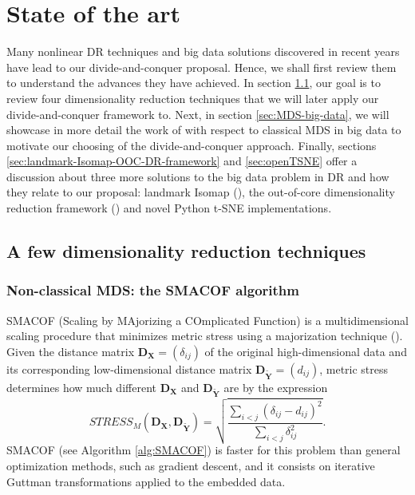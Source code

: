 \section{State of the art}

Many nonlinear DR techniques and big data solutions discovered in recent years have lead to our divide-and-conquer proposal. Hence, we shall first review them to understand the advances they have achieved. In section \ref{sec:DR-techniques}, our goal is to review four dimensionality reduction techniques that we will later apply our divide-and-conquer framework to. Next, in section \ref{sec:MDS-big-data}, we will showcase in more detail the work of \citet{Delicado2024} with respect to classical MDS in big data to motivate our choosing of the divide-and-conquer approach. Finally, sections \ref{sec:landmark-Isomap-OOC-DR-framework} and \ref{sec:openTSNE} offer a discussion about three more solutions to the big data problem in DR and how they relate to our proposal: landmark Isomap (\cite{Silva2002}), the out-of-core dimensionality reduction framework (\cite{Reichmann2024}) and novel Python t-SNE implementations.

\subsection{A few dimensionality reduction techniques}
\label{sec:DR-techniques}

\subsubsection{Non-classical MDS: the SMACOF algorithm}

SMACOF (Scaling by MAjorizing a COmplicated Function) is a multidimensional scaling procedure that minimizes metric stress using a majorization technique (\cite{Kruskal1964a,Kruskal1964b}). Given the distance matrix $\mathbf{D}_{\mathbf{X}} = (\delta_{ij})$ of the original high-dimensional data and its corresponding low-dimensional distance matrix $\mathbf{D}_{\mathbf{\tilde{Y}}} = (d_{ij})$, metric stress determines how much different $\mathbf{D}_{\mathbf{X}}$ and $\mathbf{D}_{\mathbf{\tilde{Y}}}$ are by the expression
$$
STRESS_M(\mathbf{D}_{\mathbf{X}}, \mathbf{D}_{\mathbf{\tilde{Y}}}) = \sqrt{\frac{\sum_{i<j}\left(\delta_{i j}-d_{i j}\right)^2}{\sum_{i<j} \delta_{i j}^2}}.
$$
SMACOF (see Algorithm \ref{alg:SMACOF}) is faster for this problem than general optimization methods, such as gradient descent, and it consists on iterative Guttman transformations \citep{Guttman1968} applied to the embedded data.


